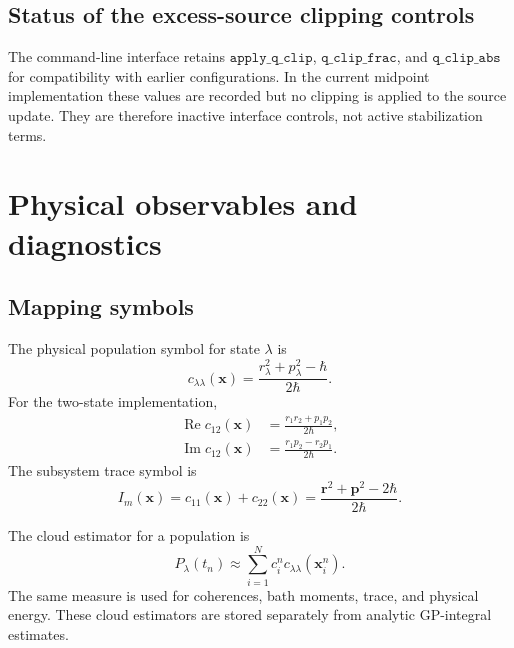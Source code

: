 \documentclass[
  11pt,
  letterpaper,
  onehalfspacing,
  normalmargins,
  equalmargins,
  oneside
]{ut-thesis}
\begin{document}
\subsection{Status of the excess-source clipping controls}
\label{appsubsec:q-clipping-status}

The command-line interface retains
\(\texttt{apply\_q\_clip}\),
\(\texttt{q\_clip\_frac}\), and
\(\texttt{q\_clip\_abs}\) for compatibility with earlier configurations.
In the current midpoint implementation these values are recorded but no
clipping is applied to the source update.  They are therefore inactive
interface controls, not active stabilization terms.

\section{Physical observables and diagnostics}
\label{appsec:observables-diagnostics}

\subsection{Mapping symbols}
\label{appsubsec:mapping-observables}

The physical population symbol for state \(\lambda\) is
\begin{equation}
c_{\lambda\lambda}(\mathbf x)
=
\frac{
r_\lambda^2+p_\lambda^2-\hbar
}{
2\hbar
}.
\label{appeq:appendix-population-symbol}
\end{equation}
For the two-state implementation,
\begin{align}
\operatorname{Re}
c_{12}(\mathbf x)
&=
\frac{
r_1r_2+p_1p_2
}{
2\hbar},
\\
\operatorname{Im}
c_{12}(\mathbf x)
&=
\frac{
r_1p_2-r_2p_1
}{
2\hbar}.
\label{appeq:appendix-coherence-symbols}
\end{align}
The subsystem trace symbol is
\begin{equation}
I_m(\mathbf x)
=
c_{11}(\mathbf x)+c_{22}(\mathbf x)
=
\frac{
\mathbf r^2+\mathbf p^2-2\hbar
}{
2\hbar}.
\label{appeq:appendix-trace-symbol}
\end{equation}

The cloud estimator for a population is
\begin{equation}
P_\lambda(t_n)
\approx
\sum_{i=1}^{N}
c_i^n
c_{\lambda\lambda}
(\mathbf x_i^n).
\label{appeq:cloud-population}
\end{equation}
The same measure is used for coherences, bath moments, trace, and physical
energy.  These cloud estimators are stored separately from analytic
GP-integral estimates.
\end{document}
